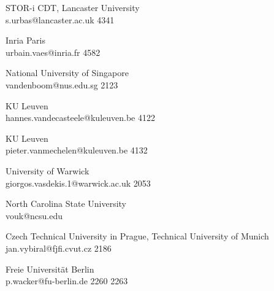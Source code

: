 \begin{multicols}{2}
 {STOR-i CDT, Lancaster University\\}%
 {s.urbas@lancaster.ac.uk}%
 {4341} %
 {} %
 {} %
 {} %
 {} %

 {Inria Paris\\}%
 {urbain.vaes@inria.fr}%
 {4582} %
 {} %
 {} %
 {} %
 {} %

 {National University of Singapore\\}%
 {vandenboom@nus.edu.sg}%
 {2123} %
 {} %
 {} %
 {} %
 {} %

 {KU Leuven\\}%
 {hannes.vandecasteele@kuleuven.be}%
 {4122} %
 {} %
 {} %
 {} %
 {} %

 {KU Leuven\\}%
 {pieter.vanmechelen@kuleuven.be}%
 {4132} %
 {} %
 {} %
 {} %
 {} %

 {University of Warwick\\}%
 {giorgos.vasdekis.1@warwick.ac.uk}%
 {2053} %
 {} %
 {} %
 {} %
 {} %

 {North Carolina State University\\}%
 {vouk@ncsu.edu}%
 {} %
 {} %
 {} %
 {} %
 {} %

 {Czech Technical University in Prague, Technical University of Munich\\}%
 {jan.vybiral@fjfi.cvut.cz}%
 {2186} %
 {} %
 {} %
 {} %
 {} %

 {Freie Universit\"{a}t Berlin\\}%
 {p.wacker@fu-berlin.de}%
 {2260} %
 {2263} %
 {} %
 {} %
 {} %


\end{multicols}
